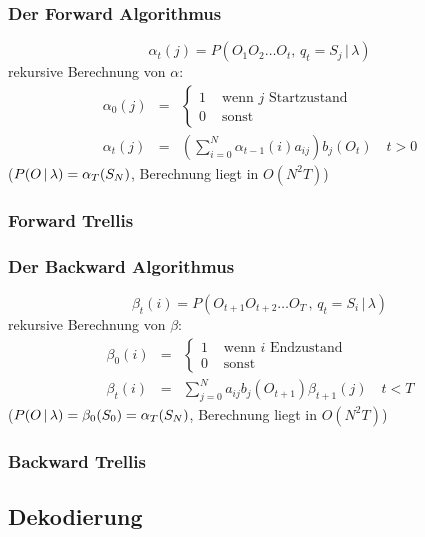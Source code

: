 \subsubsection*{Der Forward Algorithmus}

$$\alpha_{t}(j) = P(O_1O_2 \dots O_t, \, q_t = S_j \, | \, \lambda)$$
rekursive Berechnung von $\alpha$:
\begin{eqnarray*}
\alpha_0(j) &=& \left\{ \begin{array}{cl} 1 & \textrm{ wenn } j \textrm{ Startzustand} \\ 0 & \textrm{ sonst} \end{array} \right. \\
\alpha_t(j) &=& \left( \sum\limits_{i=0}^N \alpha_{t-1}(i) a_{ij} \right) b_j (O_t) \quad t > 0
\end{eqnarray*}
($P(O \, | \, \lambda) = \alpha_T(S_N)$, Berechnung liegt in $O(N^2T)$)

\subsubsection*{Forward Trellis}


\subsubsection*{Der Backward Algorithmus}

$$\beta_{t}(i) = P(O_{t+1} O_{t+2} \dots O_{T} \, , \, q_t = S_i \, | \, \lambda )$$
rekursive Berechnung von $\beta$:
\begin{eqnarray*}
\beta_0(i) &=& \left\{ \begin{array}{cl} 1 & \textrm{ wenn } i \textrm{ Endzustand} \\ 0 & \textrm{ sonst} \end{array} \right. \\
\beta_t(i) &=& \sum\limits_{j=0}^N a_{ij} b_j(O_{t+1}) \beta_{t+1} (j) \quad t < T
\end{eqnarray*}
($P(O \, | \, \lambda) = \beta_0(S_0) = \alpha_T(S_N)$, Berechnung liegt in $O(N^2T)$)

\subsubsection*{Backward Trellis}


\subsection{Dekodierung}

